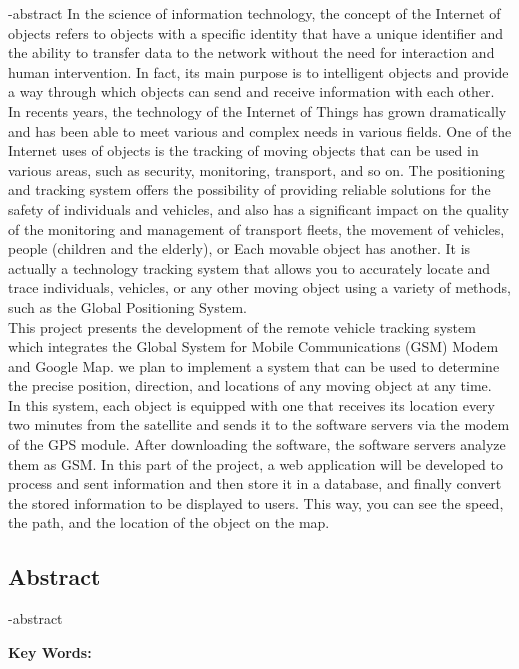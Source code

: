 
\en-abstract{
	In the science of information technology, the concept of the Internet of objects refers to objects with a specific identity that have a unique identifier and the ability to transfer data to the network without the need for interaction and human intervention. In fact, its main purpose is to intelligent objects and provide a way through which objects can send and receive information with each other.\\
	In recents years, the technology of the Internet of Things has grown dramatically and has been able to meet various and complex needs in various fields. One of the Internet uses of objects is the tracking of moving objects that can be used in various areas, such as security, monitoring, transport, and so on.
	The positioning and tracking system offers the possibility of providing reliable solutions for the safety of individuals and vehicles, and also has a significant impact on the quality of the monitoring and management of transport fleets, the movement of vehicles, people (children and the elderly), or Each movable object has another. It is actually a technology tracking system that allows you to accurately locate and trace individuals, vehicles, or any other moving object using a variety of methods, such as the Global Positioning System.\\	
	This project presents the development of the remote vehicle
	tracking system which integrates the Global System for Mobile
	Communications (GSM) Modem and Google Map. we plan to implement a system that can be used to determine the precise position, direction, and locations of any moving object at any time.\\ In this system, each object is equipped with one that receives its location every two minutes from the satellite and sends it to the software servers via the modem of the GPS module. After downloading the software, the software servers analyze them as GSM. In this part of the project, a web application will be developed to process and sent information and then store it in a database, and finally convert the stored information to be displayed to users. This way, you can see the speed, the path, and the location of the object on the map.
}

\newpage
\thispagestyle{empty}
\begin{latin}
\section*{\LARGE\centering Abstract}

\een-abstract

\vspace*{.5cm}
{\large\textbf{Key Words:}}\par
\vspace*{.5cm}
\elatinkeywords
\end{latin}